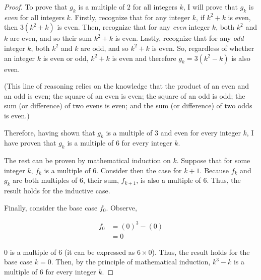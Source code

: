 \documentclass{article} %
\begin{document}
\begin{proof}
    To prove that $g_k$ is a multiple of $2$ for all integers $k$, I will prove that $g_k$ is
    \textit{even} for all integers $k$. Firstly, recognize that for any integer $k$, if 
    $k^2 + k$ is even, then $3(k^2 + k)$ is even. Then, recognize that for any \textit{even} 
    integer $k$, both $k^2$ and $k$ are even, and so their sum $k^2 + k$ is even. Lastly, recognize that
    for any \textit{odd} integer $k$, both $k^2$ and $k$ are odd, and so $k^2 + k$ is
    even. So, regardless of whether an integer $k$ is even or odd, $k^2 + k$ is even and 
    therefore $g_k = 3(k^2 - k)$ is also even. 
    
    (This line of reasoning relies on the knowledge that the product of an even and an odd is 
    even; the square of an even is even; the square
    of an odd is odd; the sum (or difference) of two evens is even; and the sum (or 
    difference) of two odds is even.)

    Therefore, having shown that $g_k$ is a multiple of $3$ and even for every integer $k$,
    I have proven that $g_k$ is a multiple of $6$ for every integer $k$.

    The rest can be proven by mathematical induction on $k$. Suppose that for some integer
    $k$, $f_k$ is a multiple of $6$. Consider then the case for $k+1$.
    Because $f_k$ and $g_k$ are both multiples of $6$, their sum, $f_{k+1}$, is also a
    multiple of $6$. Thus, the result holds for the inductive case.

    Finally, consider the base case $f_0$. Observe,

    \[\begin{aligned}
        f_0 &= (0)^3 - (0) \\
            &= 0
    \end{aligned}\]

    $0$ is a multiple of $6$ (it can be expressed as $6 \times 0$). Thus, the result holds for
    the base case $k = 0$. Then, by the principle of mathematical induction, $k^3 - k$ is
    a multiple of $6$ for every integer $k$.

\end{proof}
\end{document}
